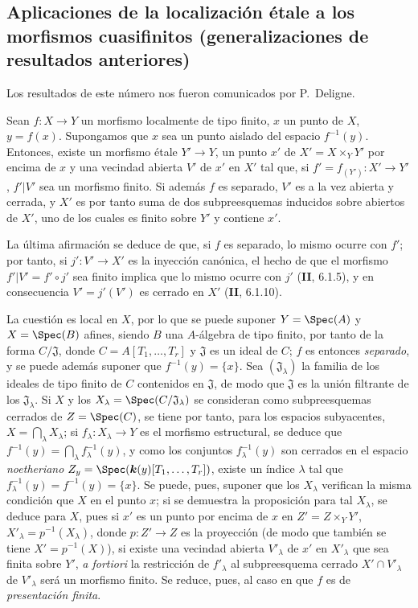\subsection{Aplicaciones de la localización étale a los morfismos cuasifinitos (generalizaciones de resultados anteriores)}
\label{subsection:IV.18.12}

Los resultados de este número nos fueron comunicados por P.~Deligne.

\begin{theorem}[18.12.1]
\label{IV.18.12.1}
Sean $f:X\to Y$ un morfismo localmente de tipo finito, $x$ un punto de $X$, $y=f(x)$. Supongamos que $x$ sea un punto aislado del espacio $f^{-1}(y)$. Entonces, existe un morfismo étale $Y'\to Y$, un punto $x'$ de $X'=X\times_Y Y'$ por encima de $x$ y una vecindad abierta $V'$ de $x'$ en $X'$ tal que, si $f'=f_{(Y')}:X'\to Y'$, $f'|V'$ sea un morfismo finito. Si además $f$ es separado, $V'$ es a la vez abierta y cerrada, y $X'$ es por tanto suma de dos subpreesquemas inducidos sobre abiertos de $X'$, uno de los cuales es finito sobre $Y'$ y contiene $x'$.
\end{theorem}

La última afirmación se deduce de que, si $f$ es separado, lo mismo ocurre con $f'$; por tanto, si $j':V'\to X'$ es la inyección canónica, el hecho de que el morfismo $f'|V'=f'\circ j'$ sea finito implica que lo mismo ocurre con $j'$ (\textbf{II}, 6.1.5), y en consecuencia $V'=j'(V')$ es cerrado en $X'$ (\textbf{II}, 6.1.10).

La cuestión es local en $X$, por lo que se puede suponer $Y=\Spec(A)$ y $X=\Spec(B)$ afines, siendo $B$ una $A$-álgebra de tipo finito, por tanto de la forma $C/\mathfrak J$, donde $C=A[T_1,\ldots,T_r]$ y $\mathfrak J$ es un ideal de $C$; $f$ es entonces \emph{separado}, y se puede además suponer que $f^{-1}(y)=\{x\}$. Sea $(\mathfrak J_\lambda)$ la familia de los ideales de tipo finito de $C$ contenidos en $\mathfrak J$, de modo que $\mathfrak J$ es la unión filtrante de los $\mathfrak J_\lambda$. Si $X$ y los $X_\lambda=\Spec(C/\mathfrak J_\lambda)$ se consideran como subpreesquemas cerrados de $Z=\Spec(C)$, se tiene por tanto, para los espacios subyacentes, $X=\bigcap_\lambda X_\lambda$; si $f_\lambda:X_\lambda\to Y$ es el morfismo estructural, se deduce que
$f^{-1}(y)=\bigcap_\lambda f_\lambda^{-1}(y)$,
y como los conjuntos $f_\lambda^{-1}(y)$ son cerrados en el espacio \emph{noetheriano} $Z_y=\Spec(\boldsymbol{k}(y)[T_1,\ldots,T_r])$, existe un índice $\lambda$ tal que $f_\lambda^{-1}(y)=f^{-1}(y)=\{x\}$. Se puede, pues, suponer que los $X_\lambda$ verifican la misma condición que $X$ en el punto $x$; si se demuestra la proposición para tal $X_\lambda$, se deduce para $X$, pues si $x'$ es un punto por encima de $x$ en $Z'=Z\times_Y Y'$, $X'_\lambda=p^{-1}(X_\lambda)$, donde $p:Z'\to Z$ es la proyección (de modo que también se tiene $X'=p^{-1}(X)$), si existe una vecindad abierta $V'_\lambda$ de $x'$ en $X'_\lambda$ que sea finita sobre $Y'$, \emph{a fortiori} la restricción de $f'_\lambda$ al subpreesquema cerrado $X'\cap V'_\lambda$ de $V'_\lambda$ será un morfismo finito. Se reduce, pues, al caso en que $f$ es de \emph{presentación finita}.

